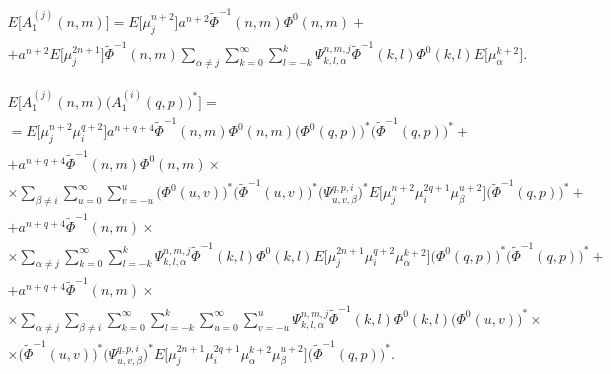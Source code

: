 \begin{multline}
E\bigg[A_1^{(j)}(n,m)\bigg]=E\Big[\mu_j^{n+2}\Big] a^{n+2} \tilde \Phi^{-1}(n,m)\Phi^0(n,m)+ \\
+a^{n+2}E\Big[\mu_j^{2n+1}\Big]\tilde \Phi^{-1}(n,m)\sum_{\alpha\neq j}\sum_{k=0}^\infty\sum_{l=-k}^k \Psi_{k,l,\alpha}^{n,m,j}\tilde \Phi^{-1}(k,l)\Phi^0(k,l)E\Big[\mu_\alpha^{k+2}\Big].
\label{eq:13:100}
\end{multline}

\begin{multline}
E\bigg[A_1^{(j)}(n,m)\Big(A_1^{(i)}(q,p)\Big)^*\bigg]= \\
=E\Big[\mu_j^{n+2}\mu_i^{q+2}\Big] a^{n+q+4} \tilde \Phi^{-1}(n,m)\Phi^0(n,m)\Big(\Phi^0(q,p)\Big)^*\Big(\tilde \Phi^{-1}(q,p)\Big)^*+ \\
+a^{n+q+4}\tilde \Phi^{-1}(n,m)\Phi^0(n,m)\times \\
\times\sum_{\beta\neq i}\sum_{u=0}^\infty\sum_{v=-u}^u \Big(\Phi^0(u,v)\Big)^*\Big(\tilde \Phi^{-1}(u,v)\Big)^*\Big(\Psi_{u,v,\beta}^{q,p,i}\Big)^*E\Big[\mu_j^{n+2}\mu_i^{2q+1}\mu_\beta^{u+2}\Big]\Big(\tilde \Phi^{-1}(q,p)\Big)^*+ \\
+a^{n+q+4}\tilde \Phi^{-1}(n,m)\times \\
\times\sum_{\alpha\neq j}\sum_{k=0}^\infty\sum_{l=-k}^k \Psi_{k,l,\alpha}^{n,m,j}\tilde \Phi^{-1}(k,l)\Phi^0(k,l)E\Big[\mu_j^{2n+1}\mu_i^{q+2}\mu_\alpha^{k+2}\Big]\Big(\Phi^0(q,p)\Big)^*\Big(\tilde \Phi^{-1}(q,p)\Big)^*+ \\
+a^{n+q+4}\tilde \Phi^{-1}(n,m)\times \\
\times\sum_{\alpha\neq j}\sum_{\beta\neq i}\sum_{k=0}^\infty\sum_{l=-k}^k\sum_{u=0}^\infty\sum_{v=-u}^u \Psi_{k,l,\alpha}^{n,m,j}\tilde \Phi^{-1}(k,l)\Phi^0(k,l)\Big(\Phi^0(u,v)\Big)^*\times \\
\times\Big(\tilde \Phi^{-1}(u,v)\Big)^*\Big(\Psi_{u,v,\beta}^{q,p,i}\Big)^*E\Big[\mu_j^{2n+1}\mu_i^{2q+1}\mu_\alpha^{k+2}\mu_\beta^{u+2}\Big]\Big(\tilde \Phi^{-1}(q,p)\Big)^*.
\label{eq:13:101}
\end{multline}
